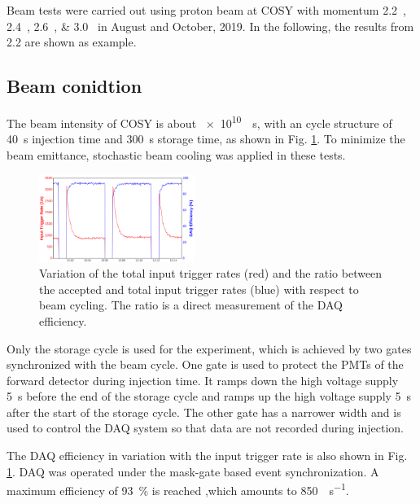 \documentclass[number,5p]{elsarticle}
\begin{document}
Beam tests were carried out using proton beam at COSY with momentum
\SIlist[list-units=single]{2.2;2.4;2.6;3.0}{\momentum} in August and October, 2019.
In the following, the results from \SI{2.2}{\momentum} are shown as example.

\subsection{Beam conidtion}
\label{sec:beam}
The beam intensity of COSY is about \SI[per-mode=reciprocal]{e10}{\per\second}, with an cycle structure of
\SI{40}{\second} injection time and \SI{300}{\second} storage time, as shown in Fig. \ref{fig:beam}.
To minimize the beam emittance, stochastic beam cooling was applied in these tests.
\begin{figure}[h]
  \centering
  \includegraphics[width=0.45\textwidth]{./daq_efficiency.png}
  \caption{Variation of the total input trigger rates (red) and the ratio between the accepted
    and total input trigger rates (blue) with respect to beam cycling. The ratio
    is a direct measurement of the DAQ efficiency.}
  \label{fig:beam}
\end{figure}

Only the storage cycle is used for the experiment, which is achieved by two
gates synchronized with the beam cycle.
One gate is used to protect the PMTs of the forward detector during injection
time.
It ramps down the high voltage supply \SI{5}{\second} before the end of the
storage cycle and ramps up the high voltage supply \SI{5}{\second} after the start of the storage cycle.
The other gate has a narrower width and is used to control the DAQ system so that data are not recorded during injection.

The DAQ efficiency in variation with the input trigger rate is also shown in Fig. \ref{fig:beam}.
DAQ was operated under the mask-gate based event synchronization.
A maximum efficiency of \SI{93}{\percent} is reached ,which amounts to \SI{850}{\event\per\second}.
\end{document}
